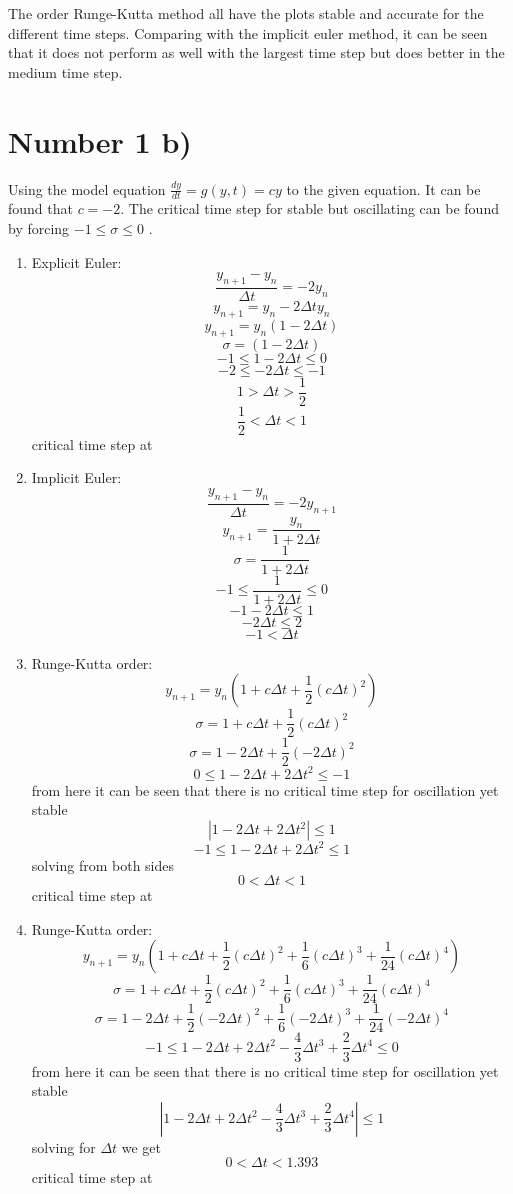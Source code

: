\documentclass{article}
\begin{document}
		The  order Runge-Kutta method all have the plots stable and accurate for the different time steps. Comparing with the implicit euler method, it can be seen that it does not perform as well with the largest time step but does better in the medium time step.
	
	\section*{Number 1 b)}
		Using the model equation $\frac{dy}{dt} = g(y,t) = cy$ to the given equation. It can be found that $c=-2$. The critical time step for stable but oscillating can be found by forcing $-1 \leq \sigma \leq 0$ .
		\begin{enumerate}[label=(\alph*)]
			\item Explicit Euler: 
				$$\frac{y_{n+1}-y_n}{\Delta t} = -2y_n $$
				$$y_{n+1} = y_{n} - 2\Delta t y_{n}$$
				$$y_{n+1} = y_{n}(1 - 2\Delta t)$$
				$$\sigma = (1-2\Delta t)$$
				$$-1 \leq 1-2\Delta t \leq 0$$
				$$-2 \leq -2\Delta t \leq -1$$
				$$1 > \Delta t > \frac{1}{2}$$
				$$ \frac{1}{2} < \Delta t < 1  $$
				critical time step at   			
			\item Implicit Euler:
				$$\frac{y_{n+1}-y_n}{\Delta t} = -2y_{n+1} $$
				$$y_{n+1} = \frac{y_n}{1+2\Delta t}$$
				$$\sigma = \frac{1}{1+2\Delta t}$$
				$$-1 \leq \frac{1}{1+2\Delta t} \leq 0 $$
				$$ -1-2\Delta t \leq 1 $$
				$$ -2 \Delta t \leq 2 $$
				$$ -1 < \Delta t $$
			\item Runge-Kutta  order:
				$$y_{n+1} = y_{n} (1+c\Delta t + \frac{1}{2} (c\Delta t)^2) $$
				$$\sigma = 1+c\Delta t + \frac{1}{2} (c\Delta t)^2  $$
				$$\sigma = 1-2\Delta t + \frac{1}{2} (-2\Delta t)^2 $$
				$$ 0 \leq 1-2\Delta t + 2\Delta t^2 \leq -1 $$
				from here it can be seen that there is no critical time step for oscillation yet stable
				$$| 1-2\Delta t + 2\Delta t^2 | \leq 1 $$
				$$ -1 \leq 1-2\Delta t + 2\Delta t^2 \leq 1 $$
				solving from both sides 
				$$ 0 < \Delta t < 1 $$
				critical time step at   	
			\item Runge-Kutta  order:
				$$y_{n+1} = y_{n} (1+c\Delta t + \frac{1}{2} (c\Delta t)^2 + \frac{1}{6} (c\Delta t)^3 + \frac{1}{24} (c\Delta t)^4) $$
				$$\sigma = 1+c\Delta t + \frac{1}{2} (c\Delta t)^2 + \frac{1}{6} (c\Delta t)^3 + \frac{1}{24} (c\Delta t)^4  $$
				$$\sigma = 1-2\Delta t + \frac{1}{2} (-2\Delta t)^2 + \frac{1}{6} (-2\Delta t)^3 + \frac{1}{24} (-2\Delta t)^4 $$
				$$-1 \leq 1-2\Delta t + 2\Delta t^2 -\frac{4}{3} \Delta t^3 + \frac{2}{3} \Delta t^4  \leq 0 $$
				from here it can be seen that there is no critical time step for oscillation yet stable
				$$| 1-2\Delta t + 2\Delta t^2 -\frac{4}{3} \Delta t^3 + \frac{2}{3} \Delta t^4 | \leq 1 $$
				solving for $\Delta t$ we get
				$$ 0 < \Delta t < 1.393 $$
				critical time step at   	
		\end{enumerate}
	
\end{document}
